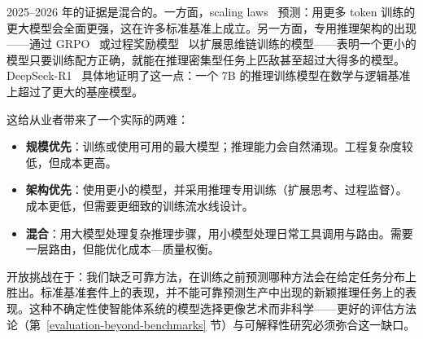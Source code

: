 2025--2026 年的证据是混合的。一方面，scaling laws~\cite{kaplan2020scaling, hoffmann2022chinchilla} 预测：用更多 token 训练的更大模型会全面更强，这在许多标准基准上成立。另一方面，专用推理架构的出现——通过 GRPO~\cite{shao2024deepseekmath} 或过程奖励模型~\cite{lightman2023lets} 以扩展思维链训练的模型——表明一个更小的模型只要训练配方正确，就能在推理密集型任务上匹敌甚至超过大得多的模型。DeepSeek-R1~\cite{deepseek2025r1} 具体地证明了这一点：一个 7B 的推理训练模型在数学与逻辑基准上超过了更大的基座模型。

这给从业者带来了一个实际的两难：

\begin{itemize}
  \item \textbf{规模优先}：训练或使用可用的最大模型；推理能力会自然涌现。工程复杂度较低，但成本更高。
  \item \textbf{架构优先}：使用更小的模型，并采用推理专用训练（扩展思考、过程监督）。成本更低，但需要更细致的训练流水线设计。
  \item \textbf{混合}：用大模型处理复杂推理步骤，用小模型处理日常工具调用与路由。需要一层路由，但能优化成本—质量权衡。
\end{itemize}

开放挑战在于：我们缺乏可靠方法，在训练之前预测哪种方法会在给定任务分布上胜出。标准基准套件上的表现，并不能可靠预测生产中出现的新颖推理任务上的表现。这种不确定性使智能体系统的模型选择更像艺术而非科学——更好的评估方法论（第~\ref{evaluation-beyond-benchmarks} 节）与可解释性研究必须弥合这一缺口。

